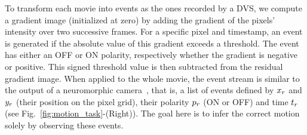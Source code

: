 \documentclass[default]{sn-jnl}%
\theoremstyle{thmstyleone}%
\theoremstyle{thmstyletwo}%
\theoremstyle{thmstylethree}%
\newcommand{\seeFig}[1]{see Fig.~\ref{fig:#1}}%
\newcommand{\note}[1]{{\sethlcolor{yellow}\hl{#1}}}
\begin{document}
To transform each movie into events as the ones recorded by a DVS, we compute a gradient image (initialized at zero) by adding the gradient of the pixels' intensity over two successive frames. For a specific pixel and timestamp, an event is generated if the absolute value of this gradient exceeds a threshold. The event has either an OFF or ON polarity, respectively whether the gradient is negative or positive. This signed threshold value is then subtracted from the residual gradient image. When applied to the whole movie, the event stream is similar to the output of a neuromorphic camera~\citep{rasetto_challenges_2022}, that is, a list of events defined by $x_r$ and $y_r$ (their position on the pixel grid), their polarity $p_r$ (ON or OFF) and time $t_r$  (\seeFig{motion_task}-(Right)). The goal here is to infer the correct motion solely by observing these events. 
%
\end{document}
